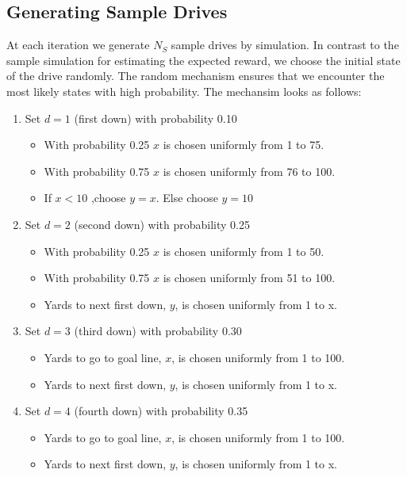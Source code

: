 \documentclass[11pt, oneside]{article}   	%
\begin{document}
\subsection{Generating Sample Drives}
At each iteration we generate $N_S$ sample drives by simulation. In contrast to the sample simulation for estimating the expected reward, we choose the initial state of the drive randomly. The random mechanism ensures that we encounter the most likely states with high probability. The mechansim looks as follows:
\begin{enumerate}
\item Set $d=1$ (first down) with probability 0.10
\begin{itemize}
\item With probability 0.25 $x$ is chosen uniformly from 1 to 75.
\item With probability 0.75 $x$ is chosen uniformly from 76 to 100.
\item If $x < 10$ ,choose $y=x$. Else choose $y=10$
\end{itemize}
\item Set $d=2$ (second down) with probability 0.25
\begin{itemize}
\item With probability 0.25 $x$ is chosen uniformly from 1 to 50.
\item With probability 0.75 $x$ is chosen uniformly from 51 to 100.
\item Yards to next first down, $y$, is chosen uniformly from 1 to x.
\end{itemize} 
\item Set $d=3$ (third down) with probability 0.30
\begin{itemize}
\item Yards to go to goal line, $x$, is chosen uniformly from 1 to 100.
\item Yards to next first down, $y$, is chosen uniformly from 1 to x.
\end{itemize}
\item Set $d=4$ (fourth down) with probability 0.35
\begin{itemize}
\item Yards to go to goal line, $x$, is chosen uniformly from 1 to 100.
\item Yards to next first down, $y$, is chosen uniformly from 1 to x.
\end{itemize}
\end{enumerate}
\end{document}

